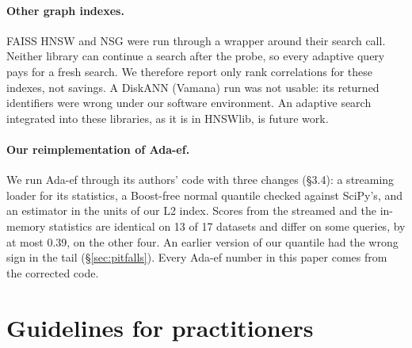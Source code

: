 \paragraph{Other graph indexes.}
FAISS HNSW and NSG were run through a wrapper around their search call. Neither library can
continue a search after the probe, so every adaptive query pays for a fresh search. We therefore
report only rank correlations for these indexes, not savings. A DiskANN (Vamana) run was not
usable: its returned identifiers were wrong under our software environment. An adaptive search
integrated into these libraries, as it is in HNSWlib, is future work.

\paragraph{Our reimplementation of Ada-ef.}
We run Ada-ef through its authors' code with three changes (\S3.4): a streaming loader for its
statistics, a Boost-free normal quantile checked against SciPy's, and an estimator in the units of
our L2 index. Scores from the streamed and the in-memory statistics are identical on 13 of 17
datasets and differ on some queries, by at most 0.39, on the other four. An earlier version of our
quantile had the wrong sign in the tail (\S\ref{sec:pitfalls}). Every Ada-ef number in this paper
comes from the corrected code.

\section{Guidelines for practitioners}\label{sec:guidelines}


